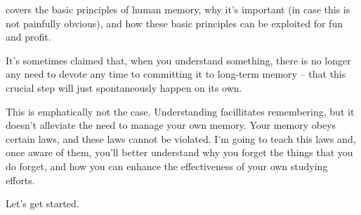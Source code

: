 covers the basic
principles of human memory, why it's important (in case this is not painfully
obvious), and how these basic principles can be exploited for fun and profit.

It's sometimes claimed that, when you understand something, there is no longer
any need to devote any time to committing it to long-term memory -- that this
crucial step will just spontaneously happen on its own.

This is emphatically not the case. Understanding facillitates remembering, but
it doesn't alleviate the need to manage your own memory. Your memory obeys
certain laws, and these laws cannot be violated. I'm going to teach this laws and, once aware of
them, you'll better understand why you forget the things that you do forget, and
how you can enhance the effectiveness of your own studying efforts.

 Let's get started.
